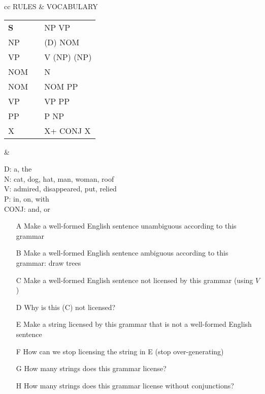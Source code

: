 \documentclass[a4paper,landscape,headrule,footrule]{foils}
\begin{document}
\begin{tabular}{cc}
  RULES & VOCABULARY \\[2ex]
  \begin{minipage}[t]{0.4\linewidth}
    \begin{tabular}[t]{lll}
      \textbf{S}  & \into & NP VP \\
      NP & \into & (D) NOM\\
      VP & \into & V (NP) (NP)\\
      NOM & \into & N\\
      NOM & \into & NOM PP \\
      VP  & \into & VP PP\\
      PP  & \into & P NP\\
      X   & \into & X+ CONJ X\\
    \end{tabular} 
  \end{minipage} &
  \begin{minipage}[t]{0.5\linewidth}
    \begin{flushleft}
  D: a, the\\
  N: cat, dog, hat, man, woman, roof\\
  V: admired, disappeared, put, relied\\
  P: in, on, with\\
  CONJ: and, or
\end{flushleft}
\end{minipage}
\end{tabular}


\begin{itemize}
\item [A] Make a well-formed English sentence unambiguous
according to this grammar
\item  [B] Make a well-formed English sentence ambiguous
according to this grammar: draw trees
\item  [C] Make a well-formed English sentence not licensed by
this grammar (using $V$)
\item [D] Why is this (C) not licensed?

\newpage
\item [E] Make a string licensed by this grammar that is not a
  well-formed English sentence
\item [F] How can we stop licensing the string in E (stop over-generating)
\item [G] How many strings does this grammar license?
\item [H] How many strings does this grammar license without conjunctions?
\end{itemize}
\end{document}
